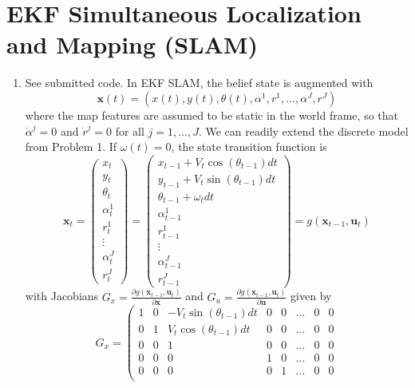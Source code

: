 \documentclass[12pt]{article}
\begin{document}
\section{EKF Simultaneous Localization and Mapping (SLAM)}
\begin{enumerate}
	\item See submitted code. In EKF SLAM, the belief state is augmented with
	\[
		\mathbf{x}(t) = (x(t), y(t), \theta(t), \alpha^1, r^1, \ldots, \alpha^J, r^J)
	\]
	where the map features are assumed to be static in the world frame, so that $\dot \alpha^j = 0$ and $\dot r^j = 0$ for all $j = 1,\ldots,J$. We can readily extend the discrete model from Problem 1. If $\omega(t) = 0$, the state transition function is
	\[
		\mathbf{x}_t = \left(\begin{array}{c}
		x_t \\
		y_t \\
		\theta_t \\
		\alpha_t^1 \\
		r_t^1 \\
		\vdots \\
		\alpha_t^J \\
		r_t^J
		\end{array}\right) = \left(\begin{array}{c}
		x_{t-1} + V_t\cos(\theta_{t-1})dt \\
		y_{t-1} + V_t\sin(\theta_{t-1})dt \\
		\theta_{t-1} + \omega_tdt \\
		\alpha_{t-1}^1 \\
		r_{t-1}^1 \\
		\vdots \\
		\alpha_{t-1}^J \\
		r_{t-1}^J
		\end{array}\right) = g(\mathbf{x}_{t-1}, \mathbf{u}_t)
	\]
	with Jacobians $G_x = \frac{\partial g(\mathbf{x}_{t-1}, \mathbf{u}_t)}{\partial \mathbf{x}}$ and $G_u = \frac{\partial g(\mathbf{x}_{t-1}, \mathbf{u}_t)}{\partial \mathbf{u}}$ given by
	\[
		G_x = \left(\begin{array}{cccccccc}
		1 & 0 & -V_t\sin(\theta_{t-1})dt & 0 & 0 & \ldots & 0 & 0 \\
		0 & 1 & V_t\cos(\theta_{t-1})dt & 0 & 0 & \ldots & 0 & 0 \\
		0 & 0 & 1 & 0 & 0 & \ldots & 0 & 0 \\
		0 & 0 & 0 & 1 & 0 & \ldots & 0 & 0 \\
		0 & 0 & 0 & 0 & 1 & \ldots & 0 & 0 \\

\end{array}\]
\end{enumerate}
\end{document}
